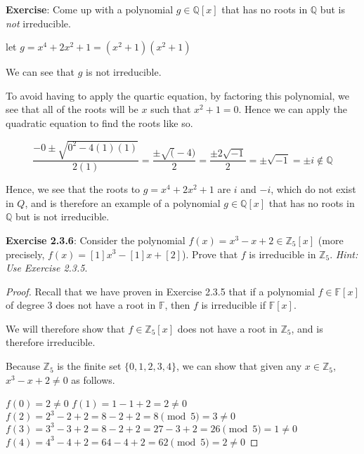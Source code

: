 \documentclass[a4paper]{article}
\begin{document}
\begin{myparindent}{0pt}
\textbf{Exercise}:
Come up with a polynomial $g \in \mathbb{Q}[x]$ that has no roots in $\mathbb{Q}$
but is \textit{not} irreducible. \newline

let $g = x^4 + 2x^2 + 1 = (x^2 + 1)(x^2 + 1)$ \newline

We can see that $g$ is not irreducible. \newline

To avoid having to apply the quartic equation, by factoring this polynomial, we
see that all of the roots will be $x$ such that $x^2 + 1 = 0$. Hence we can
apply the quadratic equation to find the roots like so.

\[
  \frac{-0 \pm \sqrt{0^2 - 4(1)(1)}}{2(1)} = \frac{\pm \sqrt(-4)}{2} =
  \frac{\pm 2 \sqrt{-1}}{2} = \pm \sqrt{-1} = \pm i \notin \mathbb{Q}
\]

Hence, we see that the roots to $g = x^4 + 2x^2 + 1$ are $i$ and $-i$, which
do not exist in $Q$, and is therefore an example of a polynomial
$g \in \mathbb{Q}[x]$ that has no roots in $\mathbb{Q}$ but is not irreducible.
\newline

\textbf{Exercise 2.3.6}:
Consider the polynomial $f(x) = x^3 - x + 2 \in \mathbb{Z}_5[x]$ (more precisely,
$f(x) = [1]x^3 - [1]x + [2]$). Prove that $f$ is irreducible in $\mathbb{Z}_5$.
\textit{Hint: Use Exercise 2.3.5}.
\newline
\begin{proof}
  Recall that we have proven in Exercise 2.3.5 that if a polynomial
  $f \in \mathbb{F}[x]$ of degree 3 does not have a root in $\mathbb{F}$, then
  $f$ is irreducible if $\mathbb{F}[x]$. \newline

  We will therefore show that $f \in \mathbb{Z}_5[x]$ does not have a root in
  $\mathbb{Z}_5$, and is therefore irreducible. \newline

  Because $\mathbb{Z}_5$ is the finite set $\{0, 1, 2, 3, 4\}$, we can show
  that given any $x \in \mathbb{Z}_5$, $x^3 - x + 2 \neq 0$ as follows.
  \newline

  $f(0) = 2 \neq 0$ \newline
  $f(1) = 1 - 1 + 2 = 2 \neq 0$ \newline
  $f(2) = 2^3 - 2 + 2 = 8 - 2 + 2 = 8 \pmod{5} = 3 \neq 0$ \newline
  $f(3) = 3^3 - 3 + 2 = 8 - 2 + 2 = 27 - 3 + 2 = 26 \pmod{5} = 1 \neq 0$ \newline
  $f(4) = 4^3 - 4 + 2 = 64 - 4 + 2 = 62 \pmod{5} = 2 \neq 0$ \newline


\end{proof}
\end{myparindent}
\end{document}
